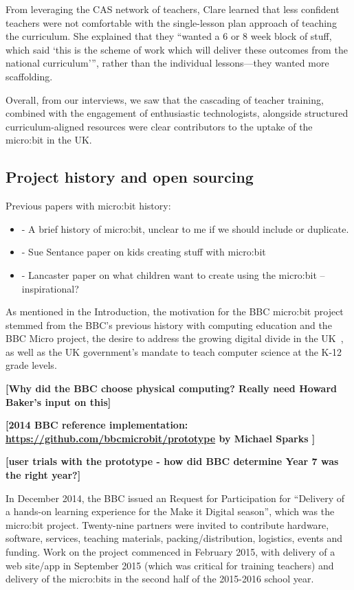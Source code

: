 From leveraging the CAS network of teachers, Clare learned that less confident teachers were not comfortable with the single-lesson plan approach of teaching the curriculum. She explained that they ``wanted a 6 or 8 week block of stuff, which said `this is the scheme of work which will deliver these outcomes from the national curriculum''', rather than the individual lessons---they wanted more scaffolding.

Overall, from our interviews, we saw that the cascading of teacher training, combined with the engagement of enthusiastic technologists, alongside structured curriculum-aligned resources were clear contributors to the uptake of the micro:bit in the UK.

\subsection{Project history and open sourcing}

Previous papers with micro:bit history:

\begin{itemize}
    \item \cite{rogers2017bbc} - A brief history of micro:bit, unclear to me if we should include or duplicate.
    \item \cite{sentance2017creating} - Sue Sentance paper on kids creating stuff with micro:bit
    \item \cite{knowles2018children} - Lancaster paper on what children want to create using the micro:bit -- inspirational?
\end{itemize}

As mentioned in the Introduction, the motivation for the BBC micro:bit project
stemmed from the BBC's previous history with computing education and the BBC Micro
project, the desire to address the growing digital divide in the UK~\cite{XYZ},
as well as the UK government's mandate to teach computer science at the K-12 grade levels.

{\bf [Why did the BBC choose physical computing? Really need Howard Baker's input on this]}

{\bf [2014 BBC reference implementation: \url{https://github.com/bbcmicrobit/prototype}
by Michael Sparks ]}

{\bf [user trials with the prototype - how did BBC determine Year 7 was the right year?] }

In December 2014, the BBC issued an Request for Participation
for ``Delivery of a hands-on learning experience for the Make it Digital season'',
which was the micro:bit project.
Twenty-nine partners were invited to contribute hardware, software, services,
teaching materials, packing/distribution, logistics, events and funding.
Work on the project commenced in February 2015, with delivery of
a web site/app in September 2015 (which was critical
for training teachers) and delivery of the micro:bits in the second
half of the 2015-2016 school year.

